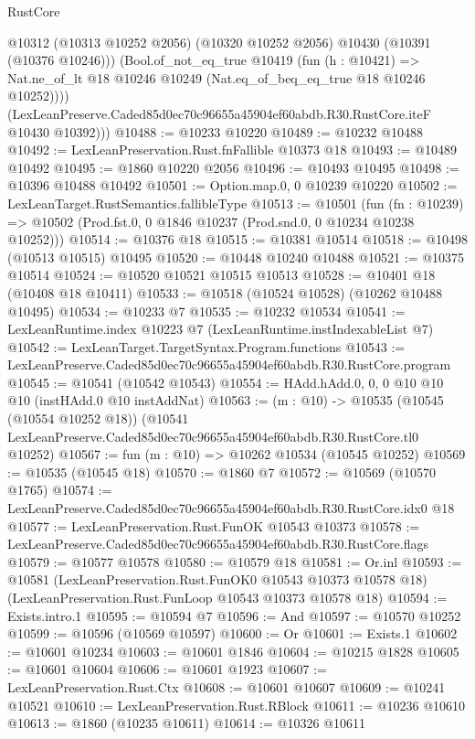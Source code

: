 \begin{lexlean}{RustCore}
\begin{coremodule}
          @10312 (@10313 @10252 @2056) (@10320 @10252 @2056) @10430 (@10391 (@10376 @10246)))
          (Bool.of_not_eq_true
            @10419
            (fun (h : @10421) =>
            Nat.ne_of_lt @18 @10246 @10249 (Nat.eq_of_beq_eq_true @18 @10246 @10252))))
        (LexLeanPreserve.Caded85d0ec70c96655a45904ef60abdb.R30.RustCore.iteF @10430 @10392)))
@10488 := @10233 @10220
@10489 := @10232 @10488
@10492 := LexLeanPreservation.Rust.fnFallible @10373 @18
@10493 := @10489 @10492
@10495 := @1860 @10220 @2056
@10496 := @10493 @10495
@10498 := @10396 @10488 @10492
@10501 := Option.map.{0, 0} @10239 @10220
@10502 := LexLeanTarget.RustSemantics.fallibleType
@10513 := @10501
    (fun (fn : @10239) =>
    @10502 (Prod.fst.{0, 0} @1846 @10237 (Prod.snd.{0, 0} @10234 @10238 @10252)))
@10514 := @10376 @18
@10515 := @10381 @10514
@10518 := @10498 (@10513 @10515) @10495
@10520 := @10448 @10240 @10488
@10521 := @10375 @10514
@10524 := @10520 @10521 @10515 @10513
@10528 := @10401 @18 (@10408 @18 @10411)
@10533 := @10518 (@10524 @10528) (@10262 @10488 @10495)
@10534 := @10233 @7
@10535 := @10232 @10534
@10541 := LexLeanRuntime.index @10223 @7 (LexLeanRuntime.instIndexableList @7)
@10542 := LexLeanTarget.TargetSyntax.Program.functions
@10543 := LexLeanPreserve.Caded85d0ec70c96655a45904ef60abdb.R30.RustCore.program
@10545 := @10541 (@10542 @10543)
@10554 := HAdd.hAdd.{0, 0, 0} @10 @10 @10 (instHAdd.{0} @10 instAddNat)
@10563 := (m : @10) ->
  @10535
    (@10545 (@10554 @10252 @18))
    (@10541 LexLeanPreserve.Caded85d0ec70c96655a45904ef60abdb.R30.RustCore.tl0 @10252)
@10567 := fun (m : @10) => @10262 @10534 (@10545 @10252)
@10569 := @10535 (@10545 @18)
@10570 := @1860 @7
@10572 := @10569 (@10570 @1765)
@10574 := LexLeanPreserve.Caded85d0ec70c96655a45904ef60abdb.R30.RustCore.idx0 @18
@10577 := LexLeanPreservation.Rust.FunOK @10543 @10373
@10578 := LexLeanPreserve.Caded85d0ec70c96655a45904ef60abdb.R30.RustCore.flags
@10579 := @10577 @10578
@10580 := @10579 @18
@10581 := Or.inl
@10593 := @10581
    (LexLeanPreservation.Rust.FunOK0 @10543 @10373 @10578 @18)
    (LexLeanPreservation.Rust.FunLoop @10543 @10373 @10578 @18)
@10594 := Exists.intro.{1}
@10595 := @10594 @7
@10596 := And
@10597 := @10570 @10252
@10599 := @10596 (@10569 @10597)
@10600 := Or
@10601 := Exists.{1}
@10602 := @10601 @10234
@10603 := @10601 @1846
@10604 := @10215 @1828
@10605 := @10601 @10604
@10606 := @10601 @1923
@10607 := LexLeanPreservation.Rust.Ctx
@10608 := @10601 @10607
@10609 := @10241 @10521
@10610 := LexLeanPreservation.Rust.RBlock
@10611 := @10236 @10610
@10613 := @1860 (@10235 @10611)
@10614 := @10326 @10611

\end{coremodule}
\end{lexlean}
